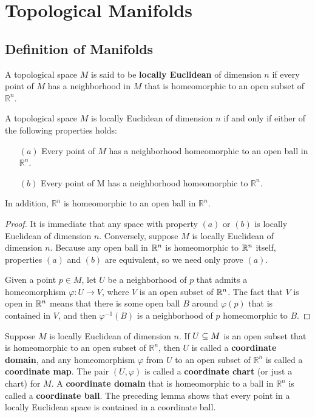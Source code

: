 \section{Topological Manifolds}
\subsection{Definition of Manifolds}
A topological space $M$ is said to be \textbf{locally Euclidean} of dimension $n$ if every point of $M$ has a neighborhood in $M$ that is homeomorphic to an open subset of $\mathbb{R}^n$.
\begin{lemma}\label{locally Euclidean lemma}
A topological space $M$ is locally Euclidean of dimension $n$ if and
only if either of the following properties holds:
\begin{itemize}
\item[$(a)$]Every point of $M$ has a neighborhood homeomorphic to an open ball in $\mathbb{R}^n$.
\item[$(b)$]Every point of M has a neighborhood homeomorphic to $\mathbb{R}^n$.
\end{itemize} 
In addition, $\mathbb{R}^n$ is homeomorphic to an open ball in $\mathbb{R}^n$.
\end{lemma}
\begin{proof}
It is immediate that any space with property $(a)$ or $(b)$ is locally Euclidean of dimension $n$. Conversely, suppose $M$ is locally Euclidean of dimension $n$. Because any open ball in $\mathbb{R}^n$ is homeomorphic to $\mathbb{R}^n$ itself, properties $(a)$ and $(b)$ are equivalent, so we need only prove $(a)$.\par
Given a point $p\in M$, let $U$ be a neighborhood of $p$ that admits a homeomorphism $\varphi:U\to V$, where $V$ is an open subset of $\mathbb{R}^n$. The fact that $V$ is open in $\mathbb{R}^n$ means that there is some open ball $B$ around $\varphi(p)$ that is contained in $V$, and then $\varphi^{-1}(B)$ is a neighborhood of $p$ homeomorphic to $B$.
\end{proof}
Suppose $M$ is locally Euclidean of dimension $n$. If $U\subseteq M$ is an open subset that is homeomorphic to an open subset of $\mathbb{R}^n$, then $U$ is called a \textbf{coordinate domain}, and any homeomorphism $\varphi$ from $U$ to an open subset of $\mathbb{R}^n$ is called a \textbf{coordinate map}. The pair $(U,\varphi)$ is called a \textbf{coordinate chart} (or just a chart) for $M$. A \textbf{coordinate domain} that is homeomorphic to a ball in $\mathbb{R}^n$ is called a \textbf{coordinate ball}. The preceding lemma shows that every point in a locally Euclidean space is contained in a coordinate ball.\par
